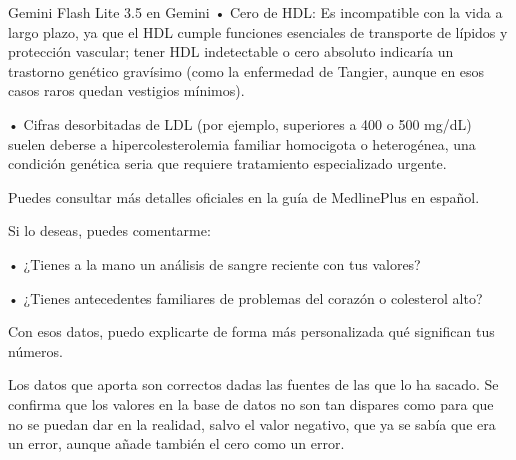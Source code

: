 \documentclass[12pt,a4paper,oneside]{book}
\begin{document}
\begin{iaresp}{Gemini Flash Lite 3.5 en Gemini}
	• Cero de HDL: Es incompatible con la vida a largo plazo, ya que el HDL cumple funciones esenciales de transporte de lípidos y protección vascular; tener HDL indetectable o cero absoluto indicaría un trastorno genético gravísimo (como la enfermedad de Tangier, aunque en esos casos raros quedan vestigios mínimos).
    
	• Cifras desorbitadas de LDL (por ejemplo, superiores a 400 o 500 mg/dL) suelen deberse a hipercolesterolemia familiar homocigota o heterogénea, una condición genética seria que requiere tratamiento especializado urgente.
    
Puedes consultar más detalles oficiales en la guía de MedlinePlus en español.

Si lo deseas, puedes comentarme:

• ¿Tienes a la mano un análisis de sangre reciente con tus valores?

• ¿Tienes antecedentes familiares de problemas del corazón o colesterol alto?

Con esos datos, puedo explicarte de forma más personalizada qué significan tus números.
\end{iaresp}
\begin{iaanalisis}
Los datos que aporta son correctos dadas las fuentes de las que lo ha sacado. Se confirma que los valores en la base de datos no son tan dispares como para que no se puedan dar en la realidad, salvo el valor negativo, que ya se sabía que era un error, aunque añade también el cero como un error.
\end{iaanalisis}
\end{document}
